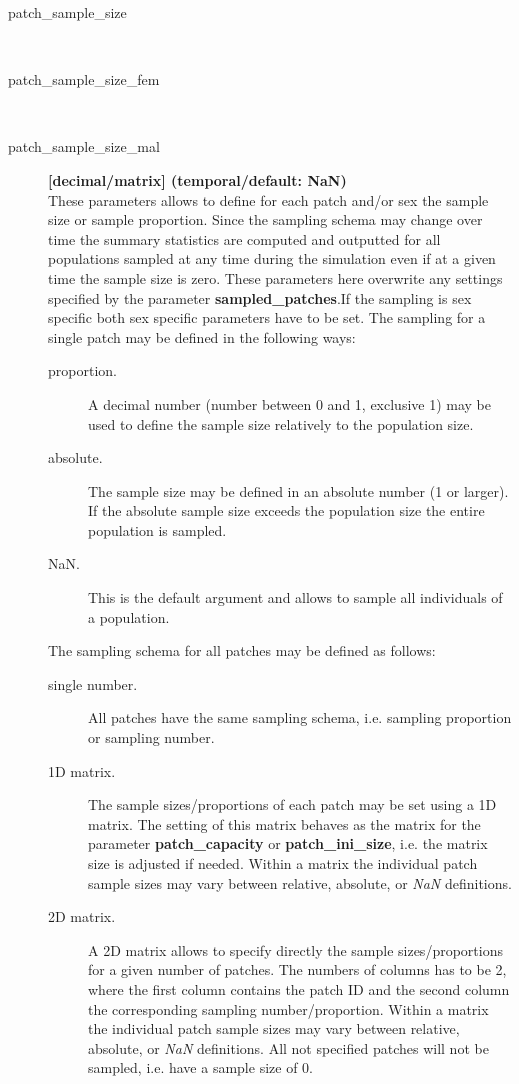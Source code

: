 \documentclass[letterpaper,12pt,oneside]{book}
\begin{document}
\begin{description}
\item[patch\_sample\_size]\hspace*{\fill}\\
\vspace{-9mm}
\item[patch\_sample\_size\_fem]\hspace*{\fill}\\
\vspace{-9mm}
\item[patch\_sample\_size\_mal]\textbf{[decimal/matrix] (temporal/default: NaN)}\\
These parameters allows to define for each patch and/or sex the sample size or sample proportion. Since the sampling schema may change over time the summary statistics are computed and outputted for all populations sampled at any time during the simulation even if at a given time the sample size is zero. These parameters here overwrite any settings specified by the parameter \textbf{sampled\_patches}.If the sampling is sex specific both sex specific parameters have to be set. The sampling for a single patch may be defined in the following ways:
\begin{description}
\item[proportion.] A decimal number (number between 0 and 1, exclusive 1) may be used to define the sample size relatively to the population size.
\item[absolute.] The sample size may be defined in an absolute number (1 or larger). If the absolute sample size exceeds the population size the entire population is sampled. 
\item[NaN.] This is the default argument and allows to sample all individuals of a population.
\end{description}

The sampling schema for all patches may be defined as follows:
\begin{description}
\item[single number.] All patches have the same sampling schema, i.e. sampling proportion or sampling number.
\item[1D matrix.] The sample sizes/proportions of each patch may be set using a 1D matrix. The setting of this matrix behaves as the matrix for the parameter \textbf{patch\_capacity} or \textbf{patch\_ini\_size}, i.e. the matrix size is adjusted if needed. Within a matrix the individual patch sample sizes may vary between relative, absolute, or \textit{NaN} definitions. 
\item[2D matrix.] A 2D matrix allows to specify directly the sample sizes/proportions for a given number of patches. The numbers of columns has to be 2, where the first column contains the patch ID and the second column the corresponding sampling number/proportion. Within a matrix the individual patch sample sizes may vary between relative, absolute, or \textit{NaN} definitions. All not specified patches will not be sampled, i.e. have a sample size of 0.
\end{description}
\end{description}
\end{document}
